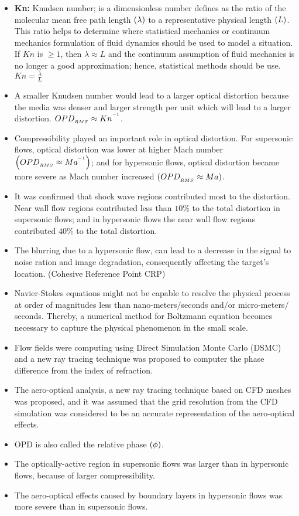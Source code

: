        \begin{itemize} 
            \item \textbf{Kn:} Knudsen number; is a dimensionless number defines as the ratio of the molecular mean free path length $\left(\lambda\right)$ to a representative physical length $\left(L\right)$. This ratio helps to determine where statistical mechanics or continuum mechanics formulation of fluid dynamics should be used to model a situation. If $Kn$ is $\geq 1$, then $\lambda \approx L$ and the continuum assumption of fluid mechanics is no longer a good approximation; hence, statistical methods should be use. $Kn = \frac{\lambda}{L}$
            \item A smaller Knudsen number would lead to a larger optical distortion because the media was denser and larger strength per unit which will lead to a larger distortion. $OPD_{_{RMS}} \approx Kn^{^{-1}}$.
            \item Compressibility played an important role in optical distortion. For supersonic flows, optical distortion was lower at higher Mach number $\left(OPD_{_{RMS}}\approx Ma^{^{-1}}\right)$; and for hypersonic flows, optical distortion became more severe as Mach number increased $\left(OPD_{_{RMS}}\approx Ma\right)$.
            \item It was confirmed that shock wave regions contributed most to the distortion. Near wall flow regions contributed less than $10\%$ to the total distortion in supersonic flows; and in hypersonic flows the near wall flow regions contributed $40\%$ to the total distortion. 
            \item The blurring due to a hypersonic flow, can lead to a decrease in the signal to noise ration and image degradation, consequently affecting the target's location. (Cohesive Reference Point CRP)     
            \item Navier-Stokes equations might not be capable to resolve the physical process at order of magnitudes less than nano-meters$/$seconds and$/$or micro-meters$/$seconds. Thereby, a numerical method for Boltzmann equation becomes necessary to capture the physical phenomenon in the small scale. 
            \item Flow fields were computing using Direct Simulation Monte Carlo (DSMC) and a new ray tracing technique was proposed to computer the phase difference from the index of refraction.  
            \item The aero-optical analysis, a new ray tracing technique based on CFD meshes was proposed, and it was assumed that the grid resolution from the CFD simulation was considered to be an accurate representation of the aero-optical effects. 
            \item OPD is also called the relative phase $\left(\phi\right)$.  
            \item The optically-active region in supersonic flows was larger than in hypersonic flows, because of larger compressibility.  
            \item The aero-optical effects caused by boundary layers in hypersonic flows was more severe than in supersonic flows. 
        \end{itemize}


